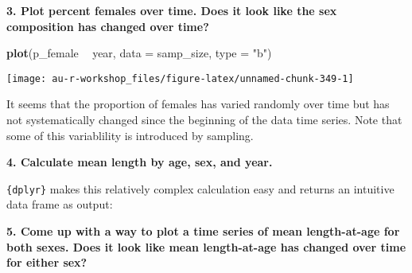 \documentclass[]{book}
\newenvironment{Shaded}{\begin{snugshade}}{\end{snugshade}}
\newcommand{\KeywordTok}[1]{\textcolor[rgb]{0.13,0.29,0.53}{\textbf{#1}}}
\newcommand{\DataTypeTok}[1]{\textcolor[rgb]{0.13,0.29,0.53}{#1}}
\newcommand{\StringTok}[1]{\textcolor[rgb]{0.31,0.60,0.02}{#1}}
\newcommand{\OperatorTok}[1]{\textcolor[rgb]{0.81,0.36,0.00}{\textbf{#1}}}
\newcommand{\NormalTok}[1]{#1}
\theoremstyle{definition}
\theoremstyle{definition}
\theoremstyle{definition}
\theoremstyle{remark}
\begin{document}
\textbf{3. Plot percent females over time. Does it look like the sex
composition has changed over time?}

\begin{Shaded}
\begin{Highlighting}[]
\KeywordTok{plot}\NormalTok{(p_female }\OperatorTok{~}\StringTok{ }\NormalTok{year, }\DataTypeTok{data =}\NormalTok{ samp_size, }\DataTypeTok{type =} \StringTok{"b"}\NormalTok{)}
\end{Highlighting}
\end{Shaded}

\begin{center}\texttt{[image: au-r-workshop\_files/figure-latex/unnamed-chunk-349-1]} \end{center}

It seems that the proportion of females has varied randomly over time
but has not systematically changed since the beginning of the data time
series. Note that some of this variablility is introduced by sampling.

\textbf{4. Calculate mean length by age, sex, and year.}

\texttt{\{dplyr\}} makes this relatively complex calculation easy and
returns an intuitive data frame as output:

\begin{Shaded}
\end{Shaded}

\textbf{5. Come up with a way to plot a time series of mean
length-at-age for both sexes. Does it look like mean length-at-age has
changed over time for either sex?}
\end{document}
